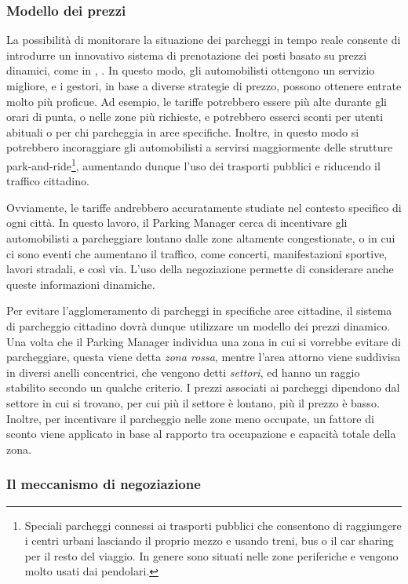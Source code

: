 \documentclass[11pt,a4paper,twoside]{article}
\numberwithin{figure}{section}
\numberwithin{equation}{section}
\begin{document}
\subsubsection{Modello dei prezzi}

La possibilità di monitorare la situazione dei parcheggi in tempo reale consente di introdurre un innovativo sistema di prenotazione dei posti basato su prezzi dinamici, come in \cite{1}, \cite{5}.
In questo modo, gli automobilisti ottengono un servizio migliore, e i gestori, in base a diverse strategie di prezzo, possono ottenere entrate molto più proficue.
Ad esempio, le tariffe potrebbero essere più alte durante gli orari di punta, o nelle zone più richieste, e potrebbero esserci sconti per utenti abituali o per chi parcheggia in aree specifiche. Inoltre, in questo modo si potrebbero incoraggiare gli automobilisti a servirsi maggiormente delle strutture park-and-ride\footnote{Speciali parcheggi connessi ai trasporti pubblici che consentono di raggiungere i centri urbani lasciando il proprio mezzo e usando treni, bus o il car sharing per il resto del viaggio. In genere sono situati nelle zone periferiche e vengono molto usati dai pendolari.}, aumentando dunque l'uso dei trasporti pubblici e riducendo il traffico cittadino.

Ovviamente, le tariffe andrebbero accuratamente studiate nel contesto specifico di ogni città. In questo lavoro, il Parking Manager cerca di incentivare gli automobilisti a parcheggiare lontano dalle zone altamente congestionate, o in cui ci sono eventi che aumentano il traffico, come concerti, manifestazioni sportive, lavori stradali, e così via. L'uso della negoziazione permette di considerare anche queste informazioni dinamiche.

Per evitare l'agglomeramento di parcheggi in specifiche aree cittadine, il sistema di parcheggio cittadino dovrà dunque utilizzare un modello dei prezzi dinamico. Una volta che il Parking Manager individua una zona in cui si vorrebbe evitare di parcheggiare, questa viene detta \emph{zona rossa}, mentre l'area attorno viene suddivisa in diversi anelli concentrici, che vengono detti \emph{settori}, ed hanno un raggio stabilito secondo un qualche criterio. I prezzi associati ai parcheggi dipendono dal settore in cui si trovano, per cui più il settore è lontano, più il prezzo è basso. Inoltre, per incentivare il parcheggio nelle zone meno occupate, un fattore di sconto viene applicato in base al rapporto tra occupazione e capacità totale della zona.

\subsubsection{Il meccanismo di negoziazione}
\end{document}
